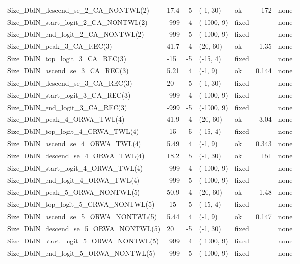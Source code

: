 \documentclass[
  english,
]{article}
\begin{document}
\begin{landscape}
\begin{longtable}{llrllrl}
Size\_DblN\_descend\_se\_2\_CA\_NONTWL(2) & 17.4 & 5 & (-1, 30) & ok & 172 & none \\ 
Size\_DblN\_start\_logit\_2\_CA\_NONTWL(2) & -999 & -4 & (-1000, 9) & fixed &  & none \\ 
Size\_DblN\_end\_logit\_2\_CA\_NONTWL(2) & -999 & -5 & (-1000, 9) & fixed &  & none \\ 
Size\_DblN\_peak\_3\_CA\_REC(3) & 41.7 & 4 & (20, 60) & ok & 1.35 & none \\ 
Size\_DblN\_top\_logit\_3\_CA\_REC(3) & -15 & -5 & (-15, 4) & fixed &  & none \\ 
Size\_DblN\_ascend\_se\_3\_CA\_REC(3) & 5.21 & 4 & (-1, 9) & ok & 0.144 & none \\ 
Size\_DblN\_descend\_se\_3\_CA\_REC(3) & 20 & -5 & (-1, 30) & fixed &  & none \\ 
Size\_DblN\_start\_logit\_3\_CA\_REC(3) & -999 & -4 & (-1000, 9) & fixed &  & none \\ 
Size\_DblN\_end\_logit\_3\_CA\_REC(3) & -999 & -5 & (-1000, 9) & fixed &  & none \\ 
Size\_DblN\_peak\_4\_ORWA\_TWL(4) & 41.9 & 4 & (20, 60) & ok & 3.04 & none \\ 
Size\_DblN\_top\_logit\_4\_ORWA\_TWL(4) & -15 & -5 & (-15, 4) & fixed &  & none \\ 
Size\_DblN\_ascend\_se\_4\_ORWA\_TWL(4) & 5.49 & 4 & (-1, 9) & ok & 0.343 & none \\ 
Size\_DblN\_descend\_se\_4\_ORWA\_TWL(4) & 18.2 & 5 & (-1, 30) & ok & 151 & none \\ 
Size\_DblN\_start\_logit\_4\_ORWA\_TWL(4) & -999 & -4 & (-1000, 9) & fixed &  & none \\ 
Size\_DblN\_end\_logit\_4\_ORWA\_TWL(4) & -999 & -5 & (-1000, 9) & fixed &  & none \\ 
Size\_DblN\_peak\_5\_ORWA\_NONTWL(5) & 50.9 & 4 & (20, 60) & ok & 1.48 & none \\ 
Size\_DblN\_top\_logit\_5\_ORWA\_NONTWL(5) & -15 & -5 & (-15, 4) & fixed &  & none \\ 
Size\_DblN\_ascend\_se\_5\_ORWA\_NONTWL(5) & 5.44 & 4 & (-1, 9) & ok & 0.147 & none \\ 
Size\_DblN\_descend\_se\_5\_ORWA\_NONTWL(5) & 20 & -5 & (-1, 30) & fixed &  & none \\ 
Size\_DblN\_start\_logit\_5\_ORWA\_NONTWL(5) & -999 & -4 & (-1000, 9) & fixed &  & none \\ 
Size\_DblN\_end\_logit\_5\_ORWA\_NONTWL(5) & -999 & -5 & (-1000, 9) & fixed &  & none \\ 

\end{longtable}
\end{landscape}
\end{document}
